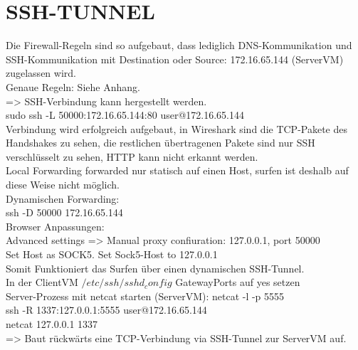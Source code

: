 \documentclass[12pt]{article}
\theoremstyle{plain}
\begin{document}
\section{SSH-TUNNEL}
Die Firewall-Regeln sind so aufgebaut, dass lediglich DNS-Kommunikation und SSH-Kommunikation mit Destination oder Source: 172.16.65.144 (ServerVM) zugelassen wird.\\
Genaue Regeln: Siehe Anhang.\\
=> SSH-Verbindung kann hergestellt werden.\\
sudo ssh -L 50000:172.16.65.144:80 user@172.16.65.144\\
Verbindung wird erfolgreich aufgebaut, in Wireshark sind die TCP-Pakete des Handshakes zu sehen, die restlichen übertragenen Pakete sind nur SSH verschlüsselt zu sehen, HTTP kann nicht erkannt werden.\\
Local Forwarding forwarded nur statisch auf einen Host, surfen ist deshalb auf diese Weise nicht möglich.\\
Dynamischen Forwarding:\\
ssh -D 50000 172.16.65.144\\
Browser Anpassungen:\\
Advanced settings => Manual proxy confiuration: 127.0.0.1, port 50000\\
Set Host as SOCK5.
Set Sock5-Host to 127.0.0.1\\
Somit Funktioniert das Surfen über einen dynamischen SSH-Tunnel.\\
In der ClientVM $/etc/ssh/sshd_config$ GatewayPorts auf yes setzen\\
Server-Prozess mit netcat starten (ServerVM):
netcat -l -p 5555\\
ssh -R 1337:127.0.0.1:5555 user@172.16.65.144\\
netcat 127.0.0.1 1337\\
=> Baut rückwärts eine TCP-Verbindung via SSH-Tunnel zur ServerVM auf.
\end{document}
